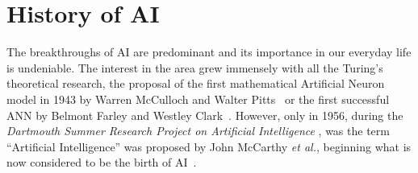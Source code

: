 \documentclass[class=report, crop=false, a4paper, 12pt]{standalone}
\begin{document}
\section{History of AI}



\par The breakthroughs of AI are predominant and its importance in our everyday life is undeniable. The interest in the area grew immensely with all the Turing's theoretical research, the proposal of the first mathematical Artificial Neuron model in 1943 by Warren McCulloch and Walter Pitts~\autocite{mccullochLOGICALCALCULUSIDEAS} or the first successful \gls{ANN} by Belmont Farley and Westley Clark~\autocite{farleySimulationSelforganizingSystems1954}. However, only in 1956, during the \textit{Dartmouth Summer Research Project on Artificial Intelligence} \autocite{mccarthyPROPOSALDARTMOUTHSUMMER}, was the term ``Artificial Intelligence'' was proposed by John McCarthy \textit{et al.}, beginning what is now considered to be the birth of AI~\autocite{zhangStudyArtificialIntelligence2021}.  
\end{document}
